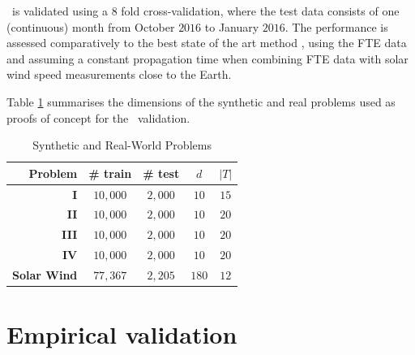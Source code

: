 \XX\ is validated using a $8$ fold cross-validation, where the test data consists of one (continuous) month 
from October $2016$ to January $2016$. The performance is assessed comparatively to the best state of the art 
method \citep{Poduval_2014,neuralnetsw}, using  the FTE data and assuming a constant propagation time when 
combining FTE data with solar wind speed measurements close to the Earth. 

Table \ref{tab:exp_data_info} summarises the dimensions of the synthetic and real problems used as proofs of concept for the \XX\ validation.
\begin{table}[htbp]
  \caption{Synthetic and Real-World Problems}\label{tab:exp_data_info}
  \centering
  \begin{tabular}{ r c c c c}
  \hline
  Problem &  \# train & \# test & $d$ & $|T|$ \\
  \hline
  \textbf{I} & $10,000$ & $2,000$  & $10$ & $15$\\
  \textbf{II} & $10,000$ & $2,000$ & $10$ & $20$\\
  \textbf{III} & $10,000$ & $2,000$ & $10$ & $20$\\
  \textbf{IV} & $10,000$ & $2,000$ & $10$ & $20$\\
  \textbf{Solar Wind} & $77,367$ & $2,205$ & $180$ & $12$\\
  \hline
  \end{tabular}
\end{table}

\section{Empirical validation}\label{sec:proofconcept}

